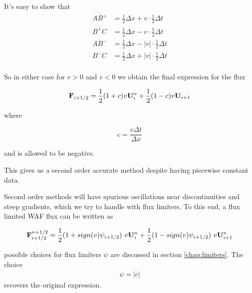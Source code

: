 It's easy to show that
\begin{align*}
	\overline{AB^+} &= \frac{1}{2} \Delta x + v \cdot \frac{1}{2} \Delta t\\
	\overline{B^+C} &= \frac{1}{2} \Delta x - v \cdot \frac{1}{2} \Delta t\\
	\overline{AB^-} &= \frac{1}{2} \Delta x - |v| \cdot \frac{1}{2} \Delta t\\
	\overline{B^-C} &= \frac{1}{2} \Delta x + |v| \cdot \frac{1}{2} \Delta t\\
\end{align*}









So in either case for $v > 0$ and $v < 0$ we obtain the final expression for the flux

\begin{equation}
	\mathbf{F}_{i+1/2} =  
		\frac{1}{2} (1 + c) v \mathbf{U}_i^n + \frac{1}{2} (1 - c) v \mathbf{U}_{i+1}
\end{equation}

where

\begin{equation}
	c = \frac{v \Delta t}{\Delta x}
\end{equation}

and is allowed to be negative.


This gives us a second order accurate method despite having piecewise constant data.

Second order methods will have spurious oscillations near discontinuities and steep gradients, which we try to handle with flux limiters.
To this end, a flux limited WAF flux can be written as

\begin{equation}
	\mathbf{F}_{i+1/2}^{n+1/2} =  
		\frac{1}{2} (1 + sign(v) \psi_{i+1/2})\ v \mathbf{U}_i^n + \frac{1}{2} (1 - sign(v) \psi_{i+1/2})\ v \mathbf{U}_{i+1}^n
\end{equation}

possible choices for flux limiters $\psi$ are discussed in section \ref{chap:limiters}. 
The choice
\begin{align*}
	\psi = |c|
\end{align*}
recovers the original expression.









